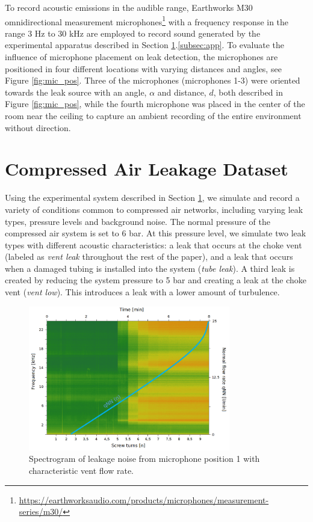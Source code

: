 To record acoustic emissions in the audible range, Earthworks M30 omnidirectional measurement microphones\footnote{\url{https://earthworksaudio.com/products/microphones/measurement-series/m30/}} with a frequency response in the range 3 Hz to 30 kHz are employed to record sound generated by the experimental apparatus described in Section \ref{sec:dataset}.\ref{subsec:app}.  %
To evaluate the influence of microphone placement on leak detection, the microphones are positioned in four different locations with varying distances and angles, see Figure \ref{fig:mic_pos}. Three of the microphones (microphones 1-3) were oriented towards the leak source with an angle, $\alpha$ and distance, $d$, both described in Figure \ref{fig:mic_pos}, while the fourth microphone was placed in the center of the room near the ceiling to capture an ambient recording of the entire environment without direction.

\section{Compressed Air Leakage Dataset}\label{sec:dataset}

Using the experimental system described in Section \ref{sec:dataset}, we simulate and record a variety of conditions common to compressed air networks, including varying leak types, pressure levels and background noise. The normal pressure of the compressed air system is set to 6 bar. At this pressure level, we simulate two leak types with different acoustic characteristics: a leak that occurs at the choke vent (labeled as \textit{vent leak} throughout the rest of the paper), and a leak that occurs when a damaged tubing is installed into the system (\textit{tube leak}). A third leak is created by reducing the system pressure to 5 bar and creating a leak at the choke vent (\textit{vent low}). This introduces a leak with a lower amount of turbulence.

\begin{figure}[h]
	\centering
	\includegraphics[width=88mm]{images/V_1_normi_qnn.png}
	\caption{Spectrogram of leakage noise from microphone position 1 with characteristic vent flow rate.}
	\label{fig:spec+qnn}
\end{figure}

